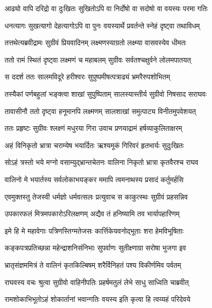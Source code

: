 \twolineshloka
{आढ्यो वापि दरिद्रो वा दुःखितः सुखितोऽपि वा}
{निर्दोषो वा सदोषो वा वयस्यः परमा गतिः} %

\twolineshloka
{धनत्यागः सुखत्यागो देहत्यागोऽपि वा पुनः}
{वयस्यार्थे प्रवर्तन्ते स्नेहं दृष्ट्वा तथाविधम्} %

\twolineshloka
{तत्तथेत्यब्रवीद्रामः सुग्रीवं प्रियवादिनम्}
{लक्ष्मणस्याग्रतो लक्ष्म्या वासवस्येव धीमतः} %

\twolineshloka
{ततो रामं स्थितं दृष्ट्वा लक्ष्मणं च महाबलम्}
{सुग्रीवः सर्वतश्चक्षुर्वने लोलमपातयत्} %

\twolineshloka
{स ददर्श ततः सालमविदूरे हरीश्वरः}
{सुपुष्पमीषत्पत्राढ्यं भ्रमरैरुपशोभितम्} %

\twolineshloka
{तस्यैकां पर्णबहुलां भङ्क्त्वा शाखां सुपुष्पिताम्}
{सालस्यास्तीर्य सुग्रीवो निषसाद सराघवः} %

\twolineshloka
{तावासीनौ ततो दृष्ट्वा हनूमानपि लक्ष्मणम्}
{सालशाखां समुत्पाट्य विनीतमुपवेशयत्} %

\twolineshloka
{ततः प्रहृष्टः सुग्रीवः श्लक्ष्णं मधुरया गिरा}
{उवाच प्रणयाद्रामं हर्षव्याकुलिताक्षरम्} %

\twolineshloka
{अहं विनिकृतो भ्रात्रा चराम्येष भयार्दितः}
{ऋश्यमूकं गिरिवरं हृतभार्यः सुदुःखितः} %

\twolineshloka
{सोऽहं त्रस्तो भये मग्नो वसाम्युद्भ्रान्तचेतनः}
{वालिना निकृतो भ्रात्रा कृतवैरश्च राघव} %

\twolineshloka
{वालिनो मे भयार्तस्य सर्वलोकाभयङ्कर}
{ममापि त्वमनाथस्य प्रसादं कर्तुमर्हसि} %

\twolineshloka
{एवमुक्तस्तु तेजस्वी धर्मज्ञो धर्मवत्सलः}
{प्रत्युवाच स काकुत्स्थः सुग्रीवं प्रहसन्निव} %

\twolineshloka
{उपकारफलं मित्रमपकारोऽरिलक्षणम्}
{अद्यैव तं हनिष्यामि तव भार्यापहारिणम्} %

\twolineshloka
{इमे हि मे महावेगाः पत्रिणस्तिग्मतेजसः}
{कार्त्तिकेयवनोद्भूताः शरा हेमविभूषिताः} %

\twolineshloka
{कङ्कपत्रप्रतिच्छन्ना महेन्द्राशनिसंनिभाः}
{सुपर्वाणः सुतीक्ष्णाग्रा सरोषा भुजगा इव} %

\twolineshloka
{भ्रातृसंज्ञममित्रं ते वालिनं कृतकिल्बिषम्}
{शरैर्विनिहतं पश्य विकीर्णमिव पर्वतम्} %

\twolineshloka
{राघवस्य वचः श्रुत्वा सुग्रीवो वाहिनीपतिः}
{प्रहर्षमतुलं लेभे साधु साध्विति चाब्रवीत्} %

\twolineshloka
{रामशोकाभिभूतोऽहं शोकार्तानां भवान्गतिः}
{वयस्य इति कृत्वा हि त्वय्यहं परिदेवये} %

